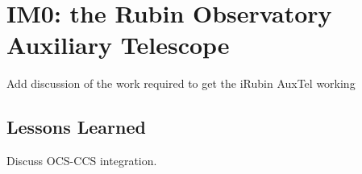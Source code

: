 \section{IM0: the Rubin Observatory Auxiliary Telescope}

Add discussion of the work required to get the iRubin AuxTel working

\subsection{Lessons Learned}

Discuss \eg \gls{OCS}-\gls{CCS} integration.

